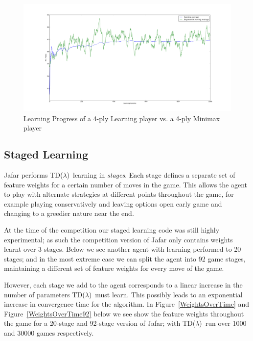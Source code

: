 \documentclass[11pt]{article}
\newcommand{\tdl}{TD($\lambda$)}
\begin{document}
\begin{figure}[htbp]
  \centering
  \includegraphics[trim= 6cm 2cm 5.5cm 3cm, clip,width=1\textwidth]{../Graphs/Learning_2ply_First1000.pdf}
  \caption{Learning Progress of a 4-ply Learning player vs. a 4-ply Minimax
    player}
  \label{LearningProgress}
\end{figure}


\subsection{Staged Learning}
\label{sec:staging}

Jafar performs \tdl\ learning in \emph{stages}. Each stage defines a separate
set of feature weights for a certain number of moves in the game. This allows
the agent to play with alternate strategies at different points throughout the
game, for example playing conservatively and leaving options open early game
and changing to a greedier nature near the end.

At the time of the competition our staged learning code was still highly 
experimental; as such the competition version of Jafar only contains weights learnt
over 3 stages. Below we see another agent with learning performed to 20 stages; 
and in the most extreme case we can split the agent into 92 game stages, maintaining a different set of
feature weights for every move of the game.

However, each stage we add to the agent corresponds to a linear increase in
the number of parameters \tdl\ must learn. This possibly leads to an
exponential increase in convergence time for the algorithm.  In
Figure~\ref{WeightsOverTime} and Figure~\ref{WeightsOverTime92} below we see
show the feature weights throughout the game for a 20-stage and 92-stage
version of Jafar; with \tdl\ run over 1000 and 30000 games respectively.
\end{document}
